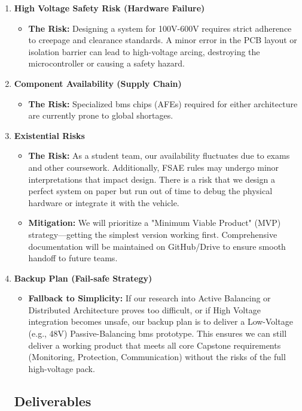 \begin{enumerate}
	\item \textbf{High Voltage Safety Risk (Hardware Failure)} \begin{itemize}
		\item \textbf{The Risk:} Designing a system for 100V-600V requires strict adherence to creepage and clearance standards. A minor error in the PCB layout or isolation barrier can lead to high-voltage arcing, destroying the microcontroller or causing a safety hazard.
	\end{itemize}
	
	\item \textbf{Component Availability (Supply Chain)} \begin{itemize}
		\item \textbf{The Risk:} Specialized \gls{bms} chips (AFEs) required for either architecture are currently prone to global shortages.
	\end{itemize}
	
	\item \textbf{Existential Risks} \begin{itemize}
		\item \textbf{The Risk:} As a student team, our availability fluctuates due to exams and other coursework. Additionally, FSAE rules may undergo minor interpretations that impact design. There is a risk that we design a perfect system on paper but run out of time to debug the physical hardware or integrate it with the vehicle.
		\item \textbf{Mitigation:} We will prioritize a "Minimum Viable Product" (MVP) strategy—getting the simplest version working first. Comprehensive documentation will be maintained on GitHub/Drive to ensure smooth handoff to future teams.
	\end{itemize}
	
	\item \textbf{Backup Plan (Fail-safe Strategy)} \begin{itemize}
		\item \textbf{Fallback to Simplicity:} If our research into Active Balancing or Distributed Architecture proves too difficult, or if High Voltage integration becomes unsafe, our backup plan is to deliver a Low-Voltage (e.g., 48V) Passive-Balancing \gls{bms} prototype. This ensures we can still deliver a working product that meets all core Capstone requirements (Monitoring, Protection, Communication) without the risks of the full high-voltage pack.
	\end{itemize}
	
	\subsection{Deliverables}
	

\end{enumerate}
